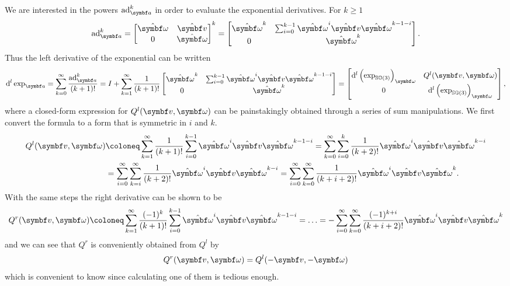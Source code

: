 We are interested in the powers $\ad_\a^k$ in order to evaluate the exponential derivatives. For $k \geq 1$
\begin{equation}
  \ad_\a^k = \begin{bmatrix}
    \hat \bomega & \hat \bv \\ 0 & \hat \bomega
  \end{bmatrix}^k
  = \begin{bmatrix}
    \hat \bomega^k & \sum_{i=0}^{k-1} \hat \bomega^{i} \hat \bv \hat \bomega^{k-1-i} \\ 0 & \hat \bomega^k
  \end{bmatrix}.
\end{equation}
Thus the left derivative of the exponential can be written
\begin{equation*}
  \mathrm{d}^l \exp_\a = \sum_{k = 0}^\infty \frac{\ad_\a^k}{(k+1)!} = I + \sum_{k = 1}^\infty \frac{1}{(k+1)!}  \begin{bmatrix}
    \hat \bomega^k & \sum_{i = 0}^{k-1} \hat \bomega^i \hat \bv \hat \bomega^{k - 1 - i} \\ 0 & \hat \bomega^k
  \end{bmatrix} = \begin{bmatrix}
    \mathrm{d}^l \left(\exp_{\SOthree}\right)_\bomega & Q^l(\bv, \bomega)                                 \\
    0                                                 & \mathrm{d}^l \left(\exp_{\SOthree}\right)_\bomega
  \end{bmatrix},
\end{equation*}
where a closed-form expression for $Q^l(\bv, \bomega)$ can be painstakingly obtained through a series of sum manipulations. We first convert the formula to a form that is symmetric in $i$ and $k$.
\begin{equation*}
  \begin{aligned}
    Q^l(\bv, \bomega) & \coloneq \sum_{k = 1}^\infty \frac{1}{(k+1)!} \sum_{i=0}^{k-1} \hat \bomega^i \hat \bv \hat \bomega^{k - 1 - i} = \sum_{k = 0}^\infty \sum_{i=0}^{k} \frac{1}{(k+2)!} \hat \bomega^i \hat \bv \hat \bomega^{k - i} \\
                      & = \sum_{i = 0}^\infty \sum_{k = i}^\infty \frac{1}{(k+2)!} \hat \bomega^i \hat \bv \hat \bomega^{k - i} = \sum_{i = 0}^\infty \sum_{k = 0}^\infty \frac{1}{(k+i+2)!} \hat \bomega^i \hat \bv \hat \bomega^{k}.
  \end{aligned}
\end{equation*}
With the same steps the right derivative can be shown to be
\begin{equation}
  \label{eq:se3_qr}
  Q^r(\bv, \bomega) \coloneq \sum_{k=1}^\infty \frac{(-1)^k}{(k+1)!} \sum_{i=0}^{k-1} \hat \bomega ^i \hat \bv \hat \bomega^{k-1-i} = \ldots = - \sum_{i = 0}^\infty \sum_{k = 0}^\infty \frac{(-1)^{k+i}}{(k+i+2)!} \hat \bomega^i \hat \bv \hat \bomega^{k}
\end{equation}
and we can see that $Q^r$ is conveniently obtained from $Q^l$ by
\begin{equation}
  Q^r(\bv, \bomega) = Q^l(-\bv, -\bomega)
\end{equation}
which is convenient to know since calculating one of them is tedious enough.

